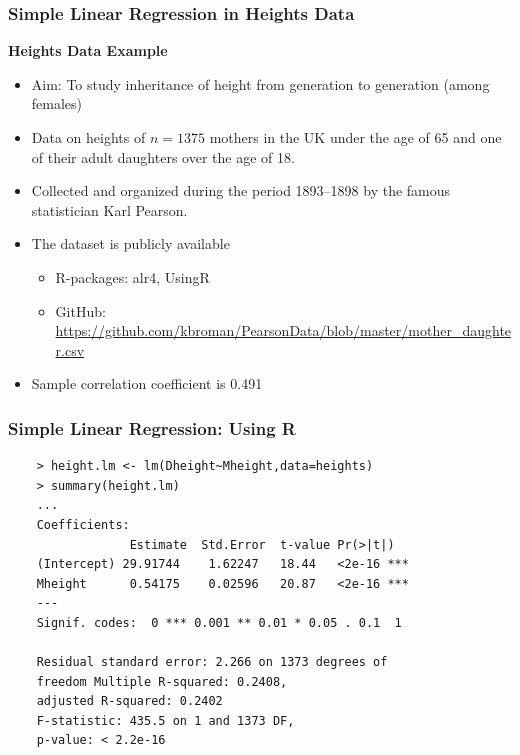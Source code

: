 \documentclass[10pt]{beamer} %
\begin{document}
\begin{frame}
	\frametitle{Simple Linear Regression in Heights Data }
\textbf{Heights Data Example}
\begin{itemize}
	\item Aim: To study inheritance of height from generation to generation
      (among females)
	\item Data on heights of $n=1375$ mothers in the UK under the age of 65 and
      one of their adult daughters over the age of 18.
   \item Collected and organized during the period 1893--1898 by the famous
      statistician Karl Pearson.
   \item The dataset is publicly available 
      \begin{itemize}
         \item R-packages: alr4, UsingR
         \item GitHub:
            \url{https://github.com/kbroman/PearsonData/blob/master/mother_daughter.csv}
      \end{itemize}
   \item Sample correlation coefficient is 0.491
\end{itemize}		
\end{frame}




\begin{frame}[fragile]
	\frametitle{Simple Linear Regression: Using R}
	\begin{verbatim}
	> height.lm <- lm(Dheight~Mheight,data=heights)
	> summary(height.lm)
	...
	Coefficients:
	             Estimate  Std.Error  t-value Pr(>|t|)
	(Intercept) 29.91744    1.62247   18.44   <2e-16 ***
	Mheight      0.54175    0.02596   20.87   <2e-16 ***
	---
	Signif. codes:  0 *** 0.001 ** 0.01 * 0.05 . 0.1  1

	Residual standard error: 2.266 on 1373 degrees of
	freedom Multiple R-squared: 0.2408, 
	adjusted R-squared: 0.2402
	F-statistic: 435.5 on 1 and 1373 DF,  
	p-value: < 2.2e-16

	\end{verbatim}
\end{frame}
\end{document}
